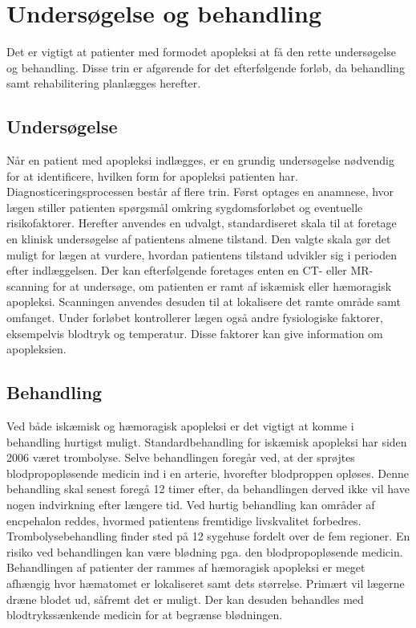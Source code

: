 \section{Undersøgelse og behandling}
Det er vigtigt at patienter med formodet apopleksi at få den rette undersøgelse og behandling. Disse trin er afgørende for det efterfølgende forløb, da behandling samt rehabilitering planlægges herefter. \cite{Sundhedsstyrelsen2009}

\subsection{Undersøgelse}
Når en patient med apopleksi indlægges, er en grundig undersøgelse nødvendig for at identificere, hvilken form for apopleksi patienten har. 
Diagnosticeringsprocessen består af flere trin. Først optages en anamnese, hvor lægen stiller patienten spørgsmål omkring sygdomsforløbet og eventuelle risikofaktorer. Herefter anvendes en udvalgt, standardiseret skala til at foretage en klinisk undersøgelse af patientens almene tilstand. Den valgte skala gør det muligt for lægen at vurdere, hvordan patientens tilstand udvikler sig i perioden efter indlæggelsen.
Der kan efterfølgende foretages enten en CT- eller MR-scanning for at undersøge, om patienten er ramt af iskæmisk eller hæmoragisk apopleksi. Scanningen anvendes desuden til at lokalisere det ramte område samt omfanget. Under forløbet kontrollerer lægen også andre fysiologiske faktorer, eksempelvis blodtryk og temperatur. Disse faktorer kan give information om apopleksien.\cite{Sundhedsstyrelsen2009} 

\subsection{Behandling}
Ved både iskæmisk og hæmoragisk apopleksi er det vigtigt at komme i behandling hurtigst muligt. \cite{Soenderborg2013}  
Standardbehandling for iskæmisk apopleksi har siden 2006 været trombolyse. Selve behandlingen foregår ved, at der sprøjtes blodpropopløsende medicin ind i en arterie, hvorefter blodproppen opløses. Denne behandling skal senest foregå 12 timer efter, da behandlingen derved ikke vil have nogen indvirkning efter længere tid. Ved hurtig behandling kan områder af encpehalon reddes, hvormed patientens fremtidige livskvalitet forbedres. Trombolysebehandling finder sted på 12 sygehuse fordelt over de fem regioner. En risiko ved behandlingen kan være blødning pga. den blodpropopløsende medicin. \cite{Hjernesagen2015b}
Behandlingen af patienter der rammes af hæmoragisk apopleksi er meget afhængig hvor hæmatomet er lokaliseret samt dets størrelse. Primært vil lægerne dræne blodet ud, såfremt det er muligt. Der kan desuden behandles med blodtrykssænkende medicin for at begrænse blødningen. \cite{Caplan2006} 


